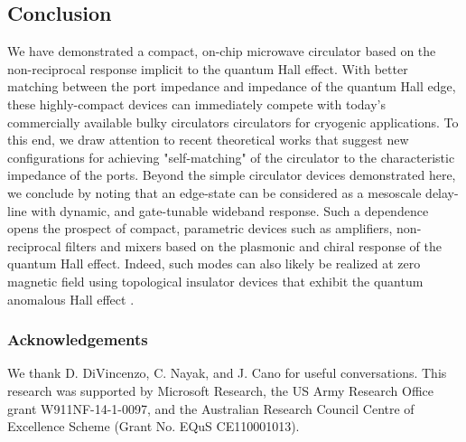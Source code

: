 \subsection{Conclusion}
We have demonstrated a compact, on-chip microwave circulator based on the non-reciprocal response implicit to the quantum Hall effect. With better matching between the port impedance and impedance of the quantum Hall edge, these highly-compact devices can immediately compete with today's commercially available bulky circulators circulators for cryogenic applications. To this end, we draw attention to recent theoretical works \cite{bosco2016self,placke2016model}  that suggest new configurations for achieving "self-matching" of the circulator to the characteristic impedance of the ports. Beyond the simple circulator devices demonstrated here, we conclude by noting that an edge-state can be considered as a mesoscale delay-line with dynamic, and gate-tunable wideband response. Such a dependence opens the prospect of compact, parametric devices such as amplifiers, non-reciprocal filters and mixers based on the plasmonic and chiral response of the quantum Hall effect. Indeed, such modes can also likely be realized at zero magnetic field using topological insulator devices that exhibit the quantum anomalous Hall effect \cite{chang2013experimental}. 

\subsubsection{Acknowledgements}
We thank D. DiVincenzo, C. Nayak, and J. Cano for useful conversations. This research was supported by Microsoft Research, the US Army Research Office grant W911NF-14-1-0097, and the Australian Research Council Centre of Excellence Scheme (Grant No. EQuS CE110001013).